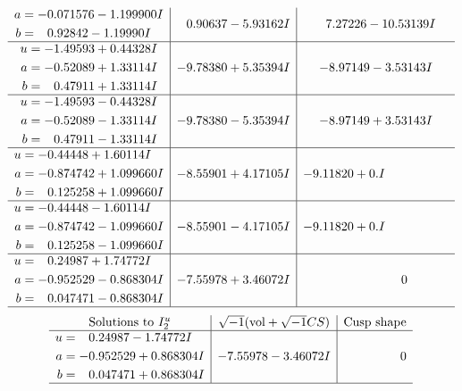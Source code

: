 \documentclass[1p]{elsarticle_modified}
\theoremstyle{definition}
\newcommand{\I}{\sqrt{-1}}
\begin{document}
$$\begin{array}{c|c|c}
\begin{aligned}
a &= -0.071576 - 1.199900 I \\
b &= \phantom{-}0.92842 - 1.19990 I\end{aligned}
 & \phantom{-}0.90637 - 5.93162 I & \phantom{-}7.27226 - 10.53139 I \\ \hline\begin{aligned}
u &= -1.49593 + 0.44328 I \\
a &= -0.52089 + 1.33114 I \\
b &= \phantom{-}0.47911 + 1.33114 I\end{aligned}
 & -9.78380 + 5.35394 I & -8.97149 - 3.53143 I \\ \hline\begin{aligned}
u &= -1.49593 - 0.44328 I \\
a &= -0.52089 - 1.33114 I \\
b &= \phantom{-}0.47911 - 1.33114 I\end{aligned}
 & -9.78380 - 5.35394 I & -8.97149 + 3.53143 I \\ \hline\begin{aligned}
u &= -0.44448 + 1.60114 I \\
a &= -0.874742 + 1.099660 I \\
b &= \phantom{-}0.125258 + 1.099660 I\end{aligned}
 & -8.55901 + 4.17105 I & -9.11820 + 0. I\phantom{ +0.000000I} \\ \hline\begin{aligned}
u &= -0.44448 - 1.60114 I \\
a &= -0.874742 - 1.099660 I \\
b &= \phantom{-}0.125258 - 1.099660 I\end{aligned}
 & -8.55901 - 4.17105 I & -9.11820 + 0. I\phantom{ +0.000000I} \\ \hline\begin{aligned}
u &= \phantom{-}0.24987 + 1.74772 I \\
a &= -0.952529 - 0.868304 I \\
b &= \phantom{-}0.047471 - 0.868304 I\end{aligned}
 & -7.55978 + 3.46072 I & \phantom{-0.000000 } 0\\
 \hline 
 \end{array}$$\newpage$$\begin{array}{c|c|c}  
\text{Solutions to }I^u_{2}& \I (\text{vol} + \sqrt{-1}CS) & \text{Cusp shape}\\
 \hline 
\begin{aligned}
u &= \phantom{-}0.24987 - 1.74772 I \\
a &= -0.952529 + 0.868304 I \\
b &= \phantom{-}0.047471 + 0.868304 I\end{aligned}
 & -7.55978 - 3.46072 I & \phantom{-0.000000 } 0\\
 \hline 
 \end{array}$$\newpage\newpage\renewcommand{\arraystretch}{1}
\end{document}
